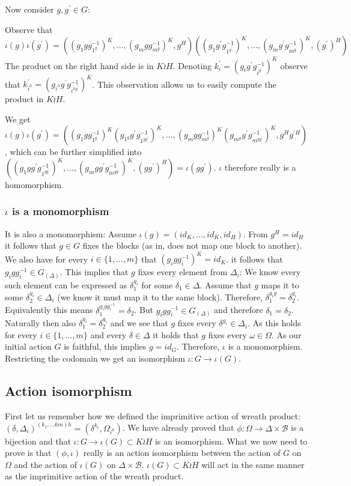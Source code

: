 \documentclass{article}
\begin{document}
\noindent Now consider $g, g^\prime \in G$:

\noindent Observe that  $\iota(g) \iota(g^\prime) = ((g_1 g g_{1^g}^{-1})^K,\dots,(g_m g g_{m^g}^{-1})^K,g^H) ((g_1 g^\prime g_{1^{g^\prime}}^{-1})^K, \dots, (g_m g^\prime g_{m^{g^\prime}}^{-1})^K, (g^\prime)^H)$ The product on the right hand side is in $K \wr H$. Denoting $k^\prime_i = (g_i g^\prime g_{i^{g^\prime}}^{-1})^K$ observe that $k^\prime_{i^{h}} = (g_{i^h} g^\prime g_{i^{h g^\prime}}^{-1})^K$. This observation allows us to easily compute the product in $K \wr H$.

\noindent We get $\iota(g) \iota(g^\prime) = ((g_1 g g_{1^g}^{-1})^K (g_{1^{g}} g^\prime g_{1^{g g^\prime}}^{-1})^K, \dots, (g_m g g_{m^g}^{-1})^K (g_{m^g} g^\prime g_{m^{g g^\prime}}^{-1})^K, g^H g^{\prime H})$, which can be further simplified into
$((g_1 g g^\prime g_{1^{g g^\prime}}^{-1})^K, \dots, (g_m g g^\prime g_{m^{g g^\prime}}^{-1})^K, (g g^\prime)^H) = \iota(g g^\prime)$.
$\iota$ therefore really is a homomorphism.

\subsubsection*{$\iota$ is a monomorphism}
It is also a monomorphism: Assume $\iota(g) = (id_K,\dots,id_K,id_H)$. From $g^H = id_H$ it follows that $g \in G$ fixes the blocks (as in, does not map one block to another). We also have for every $i \in \{1,\dots,m\}$ that $(g_i g g_{i}^{-1})^K = id_K$. it follows that $g_i g g_i^{-1} \in G_{(\Delta)}$. This implies that $g$ fixes every element from $\Delta_i$: We know every such element can be expressed as $\delta_1^{g_i}$ for some $\delta_1 \in \Delta$.  Assume that $g$ maps it to some $\delta_2^{g_i} \in \Delta_i$ (we know it must map it to the same block). Therefore, $\delta_1^{g_i g} = \delta_2^{g_i}$. Equivalently this means $\delta_1^{g_i g g_i^{-1}} = \delta_2$. But $g_i g g_i^{-1} \in G_{(\Delta)}$ and therefore $\delta_1 = \delta_2$. Naturally then also $\delta_1^{g_i} = \delta_2^{g_i}$ and we see that $g$ fixes every $\delta^{g_i} \in \Delta_i$. As this holds for every $i \in \{1,\dots,m\}$ and every $\delta \in \Delta$ it holds that $g$ fixes every $\omega \in \Omega$. As our initial action $G$ is faithful, this implies $g=id_G$. Therefore, $\iota$ is a monomorphism. Restricting the codomain we get an isomorphism $\iota: G \to \iota(G)$.
\subsection*{Action isomorphism}
First let us remember how we defined the imprimitive action of wreath product:
$(\delta, \Delta_i)^{(k_1, \dots km)h} = (\delta^{k_i},\Omega_{i^h})$. We have already proved that $\phi: \Omega \to \Delta \times \mathcal{B}$ is a bijection and that $\iota: G \to \iota(G) \subset K \wr H$ is an isomorphism. What we now need to prove is that $(\phi, \iota)$ really is an action isomorphism between the action of $G$ on $\Omega$ and the action of $\iota(G)$ on $\Delta \times \mathcal{B}$. $\iota(G) \subset K \wr H$ will act in the same manner as the imprimitive action of the wreath product.
\end{document}
